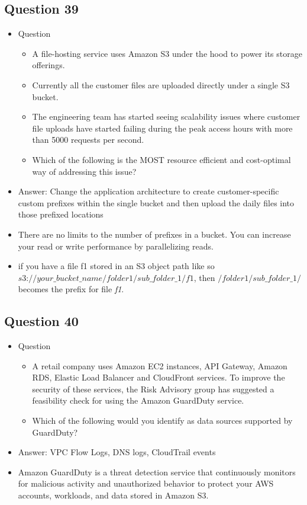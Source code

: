 \documentclass[]{scrartcl}
\begin{document}
\subsection{Question 39}
\begin{itemize}
	\item Question
	\begin{itemize}
		\item A file-hosting service uses Amazon S3 under the hood to power its storage offerings. 
		\item Currently all the customer files are uploaded directly under a single S3 bucket. 
		\item The engineering team has started seeing scalability issues where customer file uploads have started failing during the peak access hours with more than 5000 requests per second.
		\item Which of the following is the MOST resource efficient and cost-optimal way of addressing this issue?
	\end{itemize}
	\item Answer: Change the application architecture to create customer-specific custom prefixes within the single bucket and then upload the daily files into those prefixed locations
	\item There are no limits to the number of prefixes in a bucket. You can increase your read or write performance by parallelizing reads. 
	\item if you have a file f1 stored in an S3 object path like so $\textit{s3://your\_bucket\_name/folder1/sub\_folder\_1/f1}$, then $\textit{/folder1/sub\_folder\_1/}$ becomes the prefix for file \textit{f1}.
\end{itemize}

\subsection{Question 40}
\begin{itemize}
	\item Question
	\begin{itemize}
		\item A retail company uses Amazon EC2 instances, API Gateway, Amazon RDS, Elastic Load Balancer and CloudFront services. To improve the security of these services, the Risk Advisory group has suggested a feasibility check for using the Amazon GuardDuty service.
		\item Which of the following would you identify as data sources supported by GuardDuty?
	\end{itemize}
	\item Answer: VPC Flow Logs, DNS logs, CloudTrail events
	\item Amazon GuardDuty is a threat detection service that continuously monitors for malicious activity and unauthorized behavior to protect your AWS accounts, workloads, and data stored in Amazon S3. 
\end{itemize}
\end{document}
